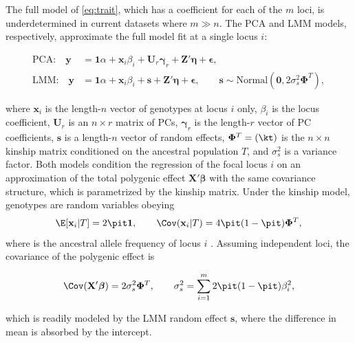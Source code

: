 \documentclass[11pt]{article}
\begin{document}
\begin{linenumbers}
The full model of \cref{eq:trait}, which has a coefficient for each of the $m$ loci, is underdetermined in current datasets where $m \gg n$.
The PCA and LMM models, respectively, approximate the full model fit at a single locus $i$:
\begin{linenomath*}
\begin{align}
  \label{eq:pca_gwas}
  \text{PCA:}\quad
  \mathbf{y}
  &=
    \mathbf{1} \alpha + \mathbf{x}_i \beta_i + \mathbf{U}_r \boldsymbol{\gamma}_r + \mathbf{Z}' \boldsymbol{\eta} + \boldsymbol{\epsilon}
    , \\
  \label{eq:lmm_gwas}
  \text{LMM:}\quad
  \mathbf{y}
  &=
    \mathbf{1} \alpha + \mathbf{x}_i \beta_i + \mathbf{s} + \mathbf{Z}' \boldsymbol{\eta} + \boldsymbol{\epsilon}
    ,
    \quad\quad
    \mathbf{s} \sim \text{Normal} \left( \mathbf{0}, 2 \sigma^2_s \mathbf{\Phi}^T \right),
\end{align}
\end{linenomath*}
where $\mathbf{x}_i$ is the length-$n$ vector of genotypes at locus $i$ only,
$\beta_i$ is the locus coefficient,
$\mathbf{U}_r$ is an $n \times r$ matrix of PCs,
$\boldsymbol{\gamma}_r$ is the length-$r$ vector of PC coefficients,
$\mathbf{s}$ is a length-$n$ vector of random effects,
$\mathbf{\Phi}^T = (\kt)$ is the $n \times n$ kinship matrix conditioned on the ancestral population $T$,
and $\sigma^2_s$ is a variance factor.
Both models condition the regression of the focal locus $i$ on an approximation of the total polygenic effect $\mathbf{X}' \boldsymbol{\beta}$ with the same covariance structure, which is parametrized by the kinship matrix.
Under the kinship model, genotypes are random variables obeying
\begin{equation}
  \label{eq:kinship_model}
  \E[ \mathbf{x}_i | T ]
  =
  2 \pit \mathbf{1},
  \quad\quad
  \Cov( \mathbf{x}_i | T )
  =
  4 \pit ( 1 - \pit ) \mathbf{\Phi}^T,
\end{equation}
where \pit is the ancestral allele frequency of locus $i$ \citep{malecot_mathematiques_1948, wright_genetical_1949, jacquard_structures_1970, astle_population_2009}.
Assuming independent loci, the covariance of the polygenic effect is
\begin{linenomath*}
$$
\Cov( \mathbf{X}' \boldsymbol{\beta} ) = 2 \sigma^2_s \mathbf{\Phi}^T,
\quad\quad
\sigma^2_s = \sum_{i=1}^m 2 \pit ( 1 - \pit ) \beta_i^2,
$$
\end{linenomath*}
which is readily modeled by the LMM random effect $\mathbf{s}$, where the difference in mean is absorbed by the intercept.

\end{linenumbers}
\end{document}
